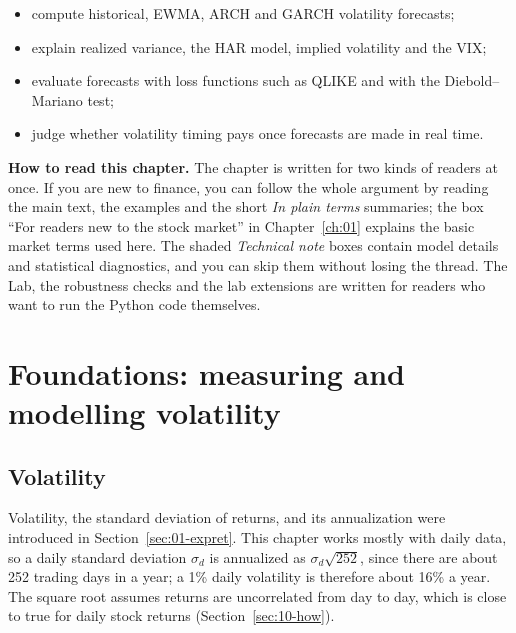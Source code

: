 \begin{itemize}[nosep]
  \item compute historical, EWMA, ARCH and GARCH volatility forecasts;
  \item explain realized variance, the HAR model, implied volatility and the VIX;
  \item evaluate forecasts with loss functions such as QLIKE and with the Diebold--Mariano test;
  \item judge whether volatility timing pays once forecasts are made in real time.
\end{itemize}

\begin{callout}
\textbf{How to read this chapter.} The chapter is written for two kinds of readers at once. If you are new to finance, you can follow the whole argument by reading the main text, the examples and the short \emph{In plain terms} summaries; the box ``For readers new to the stock market'' in Chapter~\ref{ch:01} explains the basic market terms used here. The shaded \emph{Technical note} boxes contain model details and statistical diagnostics, and you can skip them without losing the thread. The Lab, the robustness checks and the lab extensions are written for readers who want to run the Python code themselves.
\end{callout}


\section{Foundations: measuring and modelling volatility}
\label{sec:10-foundations}

\subsection{Volatility}

Volatility, the standard deviation of returns, and its annualization were introduced in Section~\ref{sec:01-expret}. This chapter works mostly with daily data, so a daily standard deviation $\sigma_d$ is annualized as $\sigma_d\sqrt{252}$, since there are about 252 trading days in a year; a 1\% daily volatility is therefore about 16\% a year. 
The square root assumes returns are uncorrelated from day to day, which is close to true for daily stock returns (Section~\ref{sec:10-how}). 

